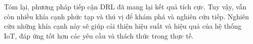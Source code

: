 \documentclass{article} %
\begin{document}
Tóm lại, phương pháp tiếp cận DRL đã mang lại kết quả tích cực. Tuy vậy, vẫn còn nhiều khía cạnh phức tạp và thú vị để khám phá và nghiên cứu tiếp. Nghiên cứu những khía cạnh này sẽ giúp cải thiện hiệu suất và hiệu quả của hệ thống IoT, đáp ứng tốt hơn các yêu cầu và thách thức trong thực tế. 


\newpage
{}


\end{document}
